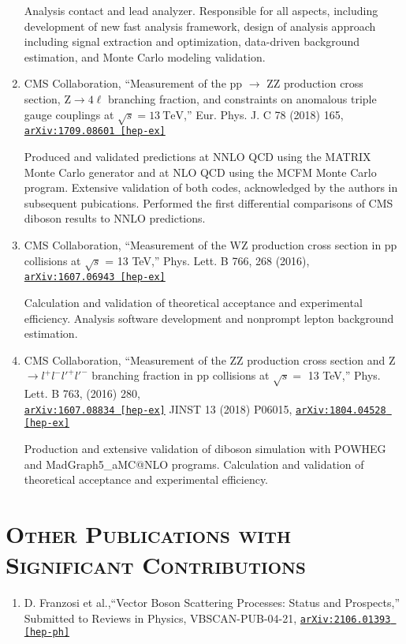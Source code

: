\documentclass[10pt]{res} %
\begin{document}
\begin{resume}
\begin{enumerate}
    Analysis contact and lead analyzer. Responsible for all aspects, 
    including development of new fast analysis framework, design of analysis approach including signal extraction and optimization,
    data-driven background estimation, and Monte Carlo modeling validation. 
  \item CMS Collaboration, ``Measurement of the pp $\rightarrow$ ZZ production cross section, $\mathrm{Z} \to 4\ell$ branching fraction, and constraints on anomalous triple gauge couplings at $\sqrt{s} = 13~\mathrm{TeV}$,'' Eur. Phys. J. C 78 (2018) 165, \href{https://arxiv.org/abs/1709.08601}{\texttt{arXiv:1709.08601 [hep-ex]}}

    Produced and validated predictions at NNLO QCD using the MATRIX Monte Carlo generator and at NLO QCD using the MCFM Monte Carlo program.
    Extensive validation of both codes, acknowledged by the authors in subsequent pubications.
    Performed the first differential comparisons of CMS diboson results to NNLO predictions.
  \item CMS Collaboration, ``Measurement of the WZ production cross section in pp collisions at $\sqrt{s}$ = 13 TeV,''
Phys. Lett. B 766, 268 (2016), \href{https://arxiv.org/abs/1607.06943}{\texttt{arXiv:1607.06943 [hep-ex]}}

    Calculation and validation of theoretical acceptance and experimental efficiency. 
    Analysis software development and nonprompt lepton background estimation.
  \item CMS Collaboration, ``Measurement of the ZZ production cross section and Z $\rightarrow l^{+}l^{-}l'^{+}l'^{-}$ branching fraction in pp collisions at $\sqrt{s} =$ 13 TeV,''
Phys. Lett. B 763, (2016) 280, \\ \href{https://arxiv.org/abs/1607.08834} {\texttt{arXiv:1607.08834 [hep-ex]}}
JINST 13 (2018) P06015, \href{https://arxiv.org/abs/1804.04528} {\texttt{arXiv:1804.04528 [hep-ex]}}

    Production and extensive validation of diboson simulation with POWHEG and MadGraph5\_aMC@NLO programs. 
    Calculation and validation of theoretical acceptance and experimental efficiency. 
\end{enumerate}

\section{\textsc{Other Publications with Significant Contributions}}
\begin{enumerate}
  \item D. Franzosi et al.,``Vector Boson Scattering Processes: Status and Prospects,''
    Submitted to Reviews in Physics, VBSCAN-PUB-04-21, \href{https://arxiv.org/abs/2106.01393}{\texttt{arXiv:2106.01393 [hep-ph]}}


\end{enumerate}
\end{resume}
\end{document}
